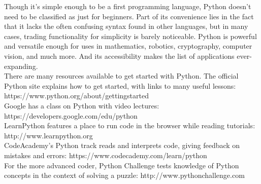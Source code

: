 \documentclass[12pt,openany]{book} %
\theoremstyle{definition}
\newcounter{code}[section]
\begin{document}
Though it's simple enough to be a first programming language, Python doesn't need to be classified as just for beginners. Part of its convenience lies in the fact that it lacks the often confusing syntax found in other languages, but in many cases, trading functionality for simplicity is barely noticeable. Python is powerful and versatile enough for uses in mathematics, robotics, cryptography, computer vision, and much more. And its accessibility makes the list of applications ever-expanding. \vspace{2mm}
\\There are many resources available to get started with Python. The official Python site explains how to get started, with links to many useful lessons: \\ https://www.python.org/about/gettingstarted  \vspace{2mm}
\\Google has a class on Python with video lectures: \\ https://developers.google.com/edu/python \vspace{2mm}
\\LearnPython features a place to run code in the browser while reading tutorials: \\ http://www.learnpython.org  \vspace{2mm}
\\CodeAcademy's Python track reads and interprets code, giving feedback on mistakes and errors:  https://www.codecademy.com/learn/python \vspace{2mm} 
\\For the more advanced coder, Python Challenge tests knowledge of Python concepts in the context of solving a puzzle:  http://www.pythonchallenge.com  \vspace{2mm}
\end{document}
